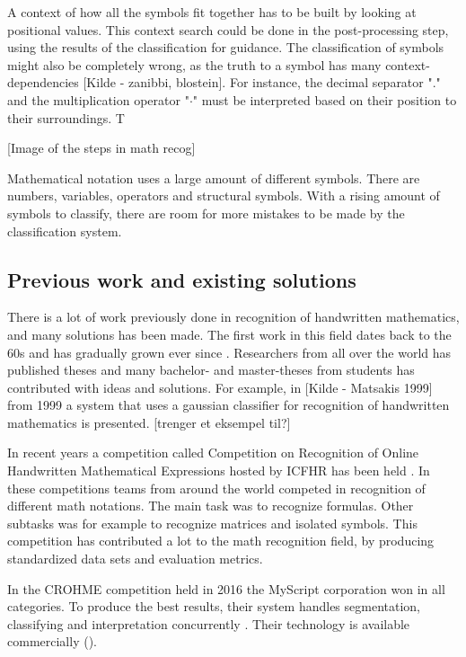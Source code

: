 A context of how all the symbols fit together has to be built by looking at positional values. This context search could be done in the post-processing step, using the results of the classification for guidance. The classification of symbols might also be completely wrong, as the truth to a symbol has many context-dependencies [Kilde - zanibbi, blostein]. For instance, the decimal separator "." and the multiplication operator "$\cdot$" must be interpreted based on their position to their surroundings. T

\begin{figure}[H]
  \centering
  \label{steps_in_math_recog}
\end{figure}
[Image of the steps in math recog]

Mathematical notation uses a large amount of different symbols. There are numbers, variables, operators and structural symbols. With a rising amount of symbols to classify, there are room for more mistakes to be made by the classification system.

\subsection{Previous work and existing solutions}
There is a lot of work previously done in recognition of handwritten mathematics, and many solutions has been made. The first work in this field dates back to the 60s and has gradually grown ever since \cite{mouchere_icfhr2016_2016}. Researchers from all over the world has published theses and many bachelor- and master-theses from students has contributed with ideas and solutions. For example, in [Kilde - Matsakis 1999] from 1999 a system that uses a gaussian classifier for recognition of handwritten mathematics is presented. [trenger et eksempel til?]

In recent years a competition called Competition on Recognition of Online Handwritten Mathematical Expressions hosted by ICFHR has been held \cite{mouchere_icfhr2016_2016} \cite{mouchere_advancing_2016}. In these competitions teams from around the world competed in recognition of different math notations. The main task was to recognize formulas. Other subtasks was for example to recognize matrices and isolated symbols. This competition has contributed a lot to the math recognition field, by producing standardized data sets and evaluation metrics.

In the CROHME competition held in 2016 the MyScript corporation won in all categories. To produce the best results, their system handles segmentation, classifying and interpretation concurrently \cite{mouchere_icfhr2016_2016}. Their technology is available commercially (\mydate).

